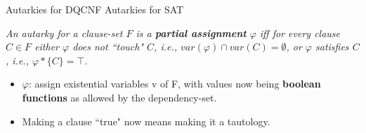 \documentclass[xcolor=table	]{beamer}
\begin{document}
%
% 
% 
%
% 

\begin{frame}{Autarkies for DQCNF}
Autarkies for SAT \newline 

\textit{An autarky for a clause-set $F$ is a \textbf{partial assignment} $\varphi$ iff for every clause $C \in F$ either $\varphi$ does not ``touch" $C$, i.e., $var(\varphi) \cap var(C) = \emptyset$, \newline or $\varphi$ satisfies $C$, i.e., $\varphi \ast \{C\} = \top$.\newline
}
\pause 

\begin{itemize}
	\item $\varphi$: 
	assign existential variables v of F, with values now being \newline \textbf{boolean functions} as allowed by the dependency-set.
	\item Making a clause ``true" now means making it a tautology.
\end{itemize}

%
\end{frame}
\end{document}
